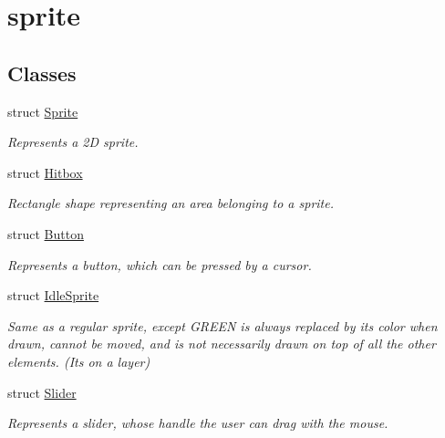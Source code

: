\hypertarget{group__sprite}{}\section{sprite}
\label{group__sprite}
\subsection*{Classes}
\begin{DoxyCompactItemize}
\item 
struct \mbox{\hyperlink{struct_sprite}{Sprite}}
\begin{DoxyCompactList}\small\item\em Represents a 2D sprite. \end{DoxyCompactList}\item 
struct \mbox{\hyperlink{struct_hitbox}{Hitbox}}
\begin{DoxyCompactList}\small\item\em Rectangle shape representing an area belonging to a sprite. \end{DoxyCompactList}\item 
struct \mbox{\hyperlink{struct_button}{Button}}
\begin{DoxyCompactList}\small\item\em Represents a button, which can be pressed by a cursor. \end{DoxyCompactList}\item 
struct \mbox{\hyperlink{struct_idle_sprite}{Idle\+Sprite}}
\begin{DoxyCompactList}\small\item\em Same as a regular sprite, except G\+R\+E\+EN is always replaced by its color when drawn, cannot be moved, and is not necessarily drawn on top of all the other elements. (It\textquotesingle{}s on a layer) \end{DoxyCompactList}\item 
struct \mbox{\hyperlink{struct_slider}{Slider}}
\begin{DoxyCompactList}\small\item\em Represents a slider, whose handle the user can drag with the mouse. \end{DoxyCompactList}\end{DoxyCompactItemize}
